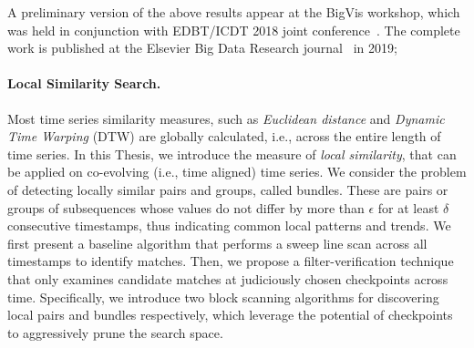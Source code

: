 A preliminary version of the above results appear at the BigVis workshop, which was held in conjunction with EDBT/ICDT 2018 joint conference~\cite{chatzigeorgakidis2018map}. The complete work is published at the Elsevier Big Data Research journal~\cite{chatzigeorgakidis2019visual} in 2019; 

\paragraph{Local Similarity Search.} Most time series similarity measures, such as \textit{Euclidean distance} and \textit{Dynamic Time Warping} (DTW) are globally calculated, i.e., across the entire length of time series. In this Thesis, we introduce the measure of \textit{local similarity}, that can be applied on co-evolving (i.e., time aligned) time series. We consider the problem of detecting locally similar pairs and groups, called bundles. These are pairs or groups of subsequences whose values do not differ by more than $\epsilon$ for at least $\delta$ consecutive timestamps, thus indicating common local patterns and trends. We first present a baseline algorithm that performs a sweep line scan across all timestamps to identify matches. Then, we propose a filter-verification technique that only examines candidate matches at judiciously chosen checkpoints across time. Specifically, we introduce two block scanning algorithms for discovering local pairs and bundles respectively, which leverage the potential of checkpoints to aggressively prune the search space.


